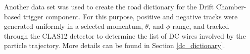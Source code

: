 Another data set was used to create the road dictionary for the Drift Chamber-based trigger component.  For this purpose, positive and negative tracks were generated uniformly  in a selected momentum, $\theta$, and $\phi$ range, and tracked through the CLAS12 detector to determine the list of DC wires involved by the particle trajectory. More details can be found in Section \ref{dc_dictionary}.
